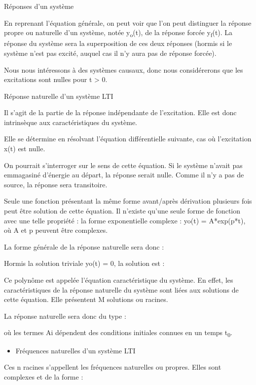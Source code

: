 \documentclass[]{article}
\begin{document}
Réponses d'un système

En reprenant l'équation générale, on peut voir que l'on peut distinguer
la réponse propre ou naturelle d'un système, notée
y\textsubscript{o}(t), de la réponse forcée y\textsubscript{f}(t). La
réponse du système sera la superposition de ces deux réponses (hormis si
le système n'est pas excité, auquel cas il n'y aura pas de réponse
forcée).

Nous nous intéressons à des systèmes causaux, donc nous considérerons
que les excitations sont nulles pour t \textgreater{} 0.

Réponse naturelle d'un système LTI

Il s'agit de la partie de la réponse indépendante de l'excitation. Elle
est donc intrinsèque aux caractéristiques du système.

Elle se détermine en résolvant l'équation différentielle suivante, cas
où l'excitation x(t) est nulle.

On pourrait s'interroger sur le sens de cette équation. Si le système
n'avait pas emmagasiné d'énergie au départ, la réponse serait nulle.
Comme il n'y a pas de source, la réponse sera transitoire.

Seule une fonction présentant la même forme avant/après dérivation
plusieurs fois peut être solution de cette équation. Il n'existe qu'une
seule forme de fonction avec une telle propriété : la forme
exponentielle complexe : yo(t) = A*exp(p*t), où A et p peuvent être
complexes.

La forme générale de la réponse naturelle sera donc :

Hormis la solution triviale yo(t) = 0, la solution est :

Ce polynôme est appelée l'équation caractéristique du système. En effet,
les caractéristiques de la réponse naturelle du système sont liées aux
solutions de cette équation. Elle présentent M solutions ou racines.~

La réponse naturelle sera donc du type :

où les termes Ai dépendent des conditions initiales connues en un temps
t\textsubscript{0}.~

\begin{itemize}
\itemsep1pt\parskip0pt
\item
  Fréquences naturelles d'un système LTI
\end{itemize}

Ces n racines s'appellent les fréquences naturelles ou propres. Elles
sont complexes et de la forme :
\end{document}
